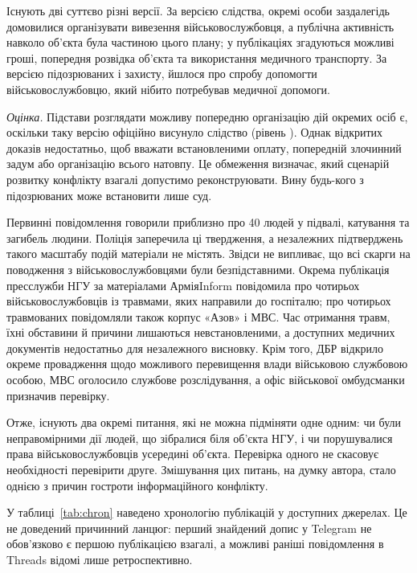 Існують дві суттєво різні версії. За версією слідства, окремі особи заздалегідь домовилися організувати вивезення військовослужбовця, а публічна активність навколо об'єкта була частиною цього плану; у публікаціях згадуються можливі гроші, попередня розвідка об'єкта та використання медичного транспорту. За версією підозрюваних і захисту, йшлося про спробу допомогти військовослужбовцю, який нібито потребував медичної допомоги.

\emph{Оцінка.} Підстави розглядати можливу попередню організацію дій окремих осіб є, оскільки таку версію офіційно висунуло слідство (рівень ). Однак відкритих доказів недостатньо, щоб вважати встановленими оплату, попередній злочинний задум або організацію всього натовпу. Це обмеження визначає, який сценарій розвитку конфлікту взагалі допустимо реконструювати. Вину будь-кого з підозрюваних може встановити лише суд.

Первинні повідомлення говорили приблизно про 40 людей у підвалі, катування та загибель людини. Поліція заперечила ці твердження, а незалежних підтверджень такого масштабу подій матеріали не містять. Звідси не випливає, що всі скарги на поводження з військовослужбовцями були безпідставними. Окрема публікація пресслужби НГУ за матеріалами АрміяInform повідомила про чотирьох військовослужбовців із травмами, яких направили до госпіталю; про чотирьох травмованих повідомляли також корпус «Азов» і МВС. Час отримання травм, їхні обставини й причини лишаються невстановленими, а доступних медичних документів недостатньо для незалежного висновку. Крім того, ДБР відкрило окреме провадження щодо можливого перевищення влади військовою службовою особою, МВС оголосило службове розслідування, а офіс військової омбудсманки призначив перевірку.

Отже, існують два окремі питання, які не можна підміняти одне одним: чи були неправомірними дії людей, що зібралися біля об'єкта НГУ, і чи порушувалися права військовослужбовців усередині об'єкта. Перевірка одного не скасовує необхідності перевірити друге. Змішування цих питань, на думку автора, стало однією з причин гостроти інформаційного конфлікту.

У таблиці~\ref{tab:chron} наведено хронологію публікацій у доступних джерелах. Це не доведений причинний ланцюг: перший знайдений допис у Telegram не обов'язково є першою публікацією взагалі, а можливі раніші повідомлення в Threads відомі лише ретроспективно.


